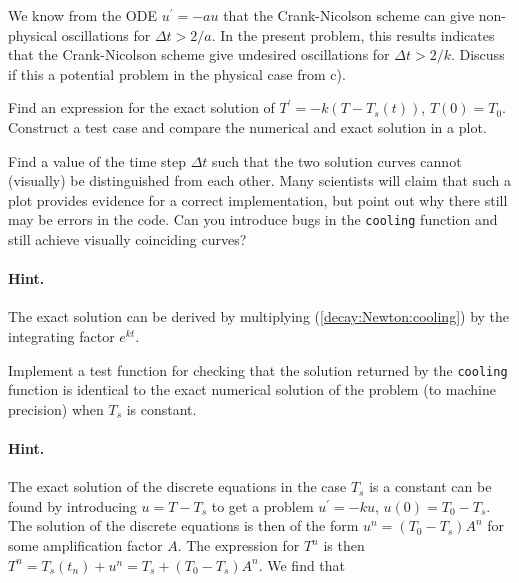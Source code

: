 \documentclass[graybox,sectrefs,envcountresetchap,open=right,final]{svmonodo}
\newenvironment{doconceexercise}{}{}
\begin{document}
\begin{doconceexercise}

We know from the ODE $u^\prime =-au$ that the Crank-Nicolson scheme
can give non-physical oscillations for $\Delta t > 2/a$.
In the present problem, this results indicates
that the Crank-Nicolson scheme give undesired
oscillations for $\Delta t > 2/k$.
Discuss if this a potential problem in the physical case from c).



Find an expression for the exact solution of
$T^{\prime} = -k(T-T_s(t))$, $T(0)=T_0$.
Construct a test case and compare the
numerical and exact solution in a plot.

Find a value of the time step
$\Delta t$ such that the two solution curves cannot (visually) be
distinguished from each other. Many scientists will claim that such a
plot provides evidence for a correct implementation, but point out why
there still may be errors in the code.  Can you introduce bugs in the
\texttt{cooling} function and still achieve visually coinciding curves?


\paragraph{Hint.}
The exact solution can be derived by multiplying (\ref{decay:Newton:cooling})
by the integrating factor $e^{kt}$.




Implement a test function for checking that the solution returned by
the \texttt{cooling} function is identical to the exact numerical
solution of the problem (to machine precision) when $T_s$ is constant.


\paragraph{Hint.}
The exact solution of the
discrete equations in the case $T_s$ is a constant can be found by
introducing $u=T-T_s$ to get a problem $u^{\prime}=-ku$, $u(0)=T_0-T_s$.
The solution of the discrete equations is then of the form
$u^{n}=(T_0-T_s)A^n$ for some amplification factor $A$. The
expression for $T^n$ is then $T^n = T_s(t_n) + u^n =
T_s + (T_0-T_s)A^n$.
We find that


\end{doconceexercise}
\end{document}
